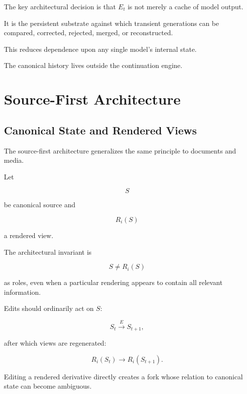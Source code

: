 \documentclass[11pt]{article}
\theoremstyle{remark}
\begin{document}
The key architectural decision is that $E_t$ is not merely a cache of model output.

It is the persistent substrate against which transient generations can be compared, corrected, rejected, merged, or reconstructed.

This reduces dependence upon any single model's internal state.

The canonical history lives outside the continuation engine.

\section{Source-First Architecture}

\subsection{Canonical State and Rendered Views}

The source-first architecture generalizes the same principle to documents and media.

Let

\begin{equation}
S
\end{equation}

be canonical source and

\begin{equation}
R_i(S)
\end{equation}

a rendered view.

The architectural invariant is

\begin{equation}
S\neq R_i(S)
\end{equation}

as roles, even when a particular rendering appears to contain all relevant information.

Edits should ordinarily act on $S$:

\begin{equation}
S_t
\xrightarrow{E}
S_{t+1},
\end{equation}

after which views are regenerated:

\begin{equation}
R_i(S_t)
\longrightarrow
R_i(S_{t+1}).
\end{equation}

Editing a rendered derivative directly creates a fork whose relation to canonical state can become ambiguous.
\end{document}
